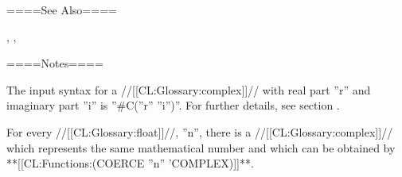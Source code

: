 ====See Also====

{\secref\RuleOfCanonRepForComplexRationals}, {\secref\NumsFromTokens}, {\secref\PrintingComplexes}

====Notes====

The input syntax for a //[[CL:Glossary:complex]]// with real part ''r'' and imaginary part ''i'' is ''#C(''r'' ''i'')''. For further details, see section {\secref\StandardMacroChars}.

For every //[[CL:Glossary:float]]//, ''n'', there is a //[[CL:Glossary:complex]]// which represents the same mathematical number and which can be obtained by **[[CL:Functions:(COERCE ''n'' 'COMPLEX)]]**.

 
